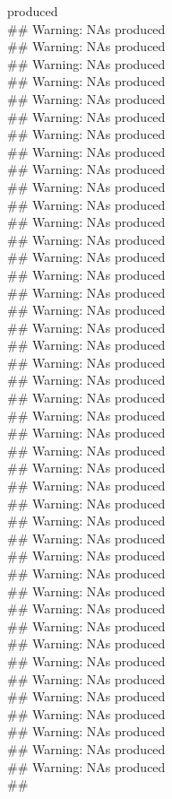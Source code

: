 \documentclass{article}\usepackage[]{graphicx}\usepackage[]{color}
\makeatletter
\newenvironment{kframe}{%
 \def\at@end@of@kframe{}%
 \ifinner\ifhmode%
  \def\at@end@of@kframe{\end{minipage}}%
  \begin{minipage}{\columnwidth}%
 \fi\fi%
 \def\FrameCommand##1{\hskip\@totalleftmargin \hskip-\fboxsep
 \colorbox{shadecolor}{##1}\hskip-\fboxsep
     \hskip-\linewidth \hskip-\@totalleftmargin \hskip\columnwidth}%
 \MakeFramed {\advance\hsize-\width
   \@totalleftmargin\z@ \linewidth\hsize
   \@setminipage}}%
 {\par\unskip\endMakeFramed%
 \at@end@of@kframe}
\newenvironment{knitrout}{}{} %
\makeatother
\begin{document}
\begin{knitrout}
\begin{kframe}
produced\\\#\# Warning: NAs produced\\\#\# Warning: NAs produced\\\#\# Warning: NAs produced\\\#\# Warning: NAs produced\\\#\# Warning: NAs produced\\\#\# Warning: NAs produced\\\#\# Warning: NAs produced\\\#\# Warning: NAs produced\\\#\# Warning: NAs produced\\\#\# Warning: NAs produced\\\#\# Warning: NAs produced\\\#\# Warning: NAs produced\\\#\# Warning: NAs produced\\\#\# Warning: NAs produced\\\#\# Warning: NAs produced\\\#\# Warning: NAs produced\\\#\# Warning: NAs produced\\\#\# Warning: NAs produced\\\#\# Warning: NAs produced\\\#\# Warning: NAs produced\\\#\# Warning: NAs produced\\\#\# Warning: NAs produced\\\#\# Warning: NAs produced\\\#\# Warning: NAs produced\\\#\# Warning: NAs produced\\\#\# Warning: NAs produced\\\#\# Warning: NAs produced\\\#\# Warning: NAs produced\\\#\# Warning: NAs produced\\\#\# Warning: NAs produced\\\#\# Warning: NAs produced\\\#\# Warning: NAs produced\\\#\# Warning: NAs produced\\\#\# Warning: NAs produced\\\#\# Warning: NAs produced\\\#\# Warning: NAs produced\\\#\# Warning: NAs produced\\\#\# Warning: NAs produced\\\#\# Warning: NAs produced\\\#\# Warning: NAs produced\\\#\# Warning: NAs produced\\\#\# Warning: NAs produced\\\#\# Warning: NAs produced\\\#\# 
\end{kframe}
\end{knitrout}
\end{document}
